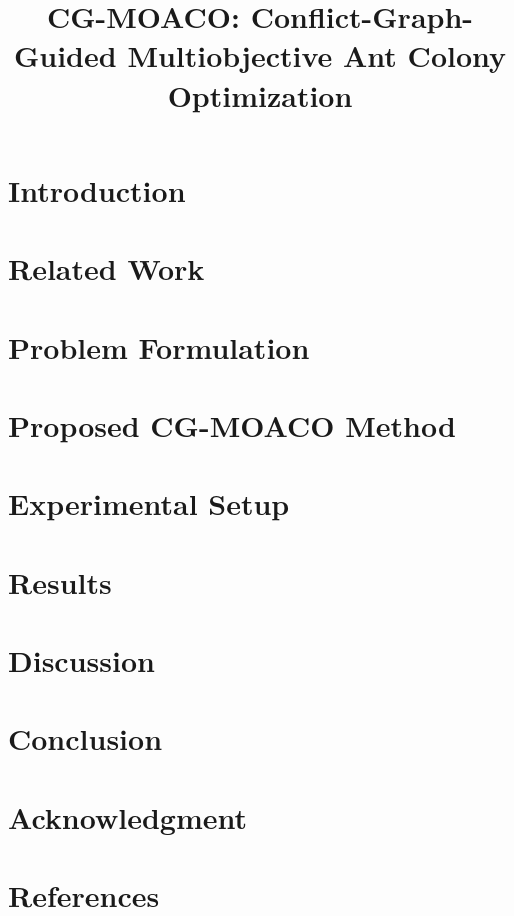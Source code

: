 \documentclass[journal]{IEEEtran}
\begin{document}
\title{CG-MOACO: Conflict-Graph-Guided Multiobjective Ant Colony Optimization}

\author{}


\maketitle

\begin{abstract}
\end{abstract}

\begin{IEEEkeywords}
\end{IEEEkeywords}

\section{Introduction}

\section{Related Work}

\section{Problem Formulation}

\section{Proposed CG-MOACO Method}

\section{Experimental Setup}

\section{Results}

\section{Discussion}

\section{Conclusion}

\section*{Acknowledgment}

\section*{References}
\end{document}
